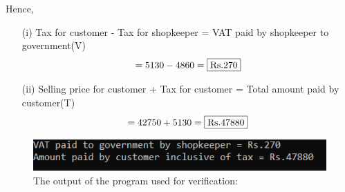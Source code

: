 \documentclass[journal,12pt,two column]{IEEEtran}
\begin{document}
Hence,
\begin{enumerate}
\item[(i)]Tax for customer - Tax for shopkeeper = 
    VAT paid by shopkeeper to government(V)  
     \begin{equation*}
        = 5130 - 4860 = \fbox{Rs.270}
     \end{equation*}
\item[(ii)]Selling price for customer + Tax for customer = Total amount paid by customer(T) 
    \begin{equation*}
       = 42750 + 5130 = \fbox{Rs.47880}
   \end{equation*} 
\end{enumerate}

\begin{figure}[ht!]
     \centering
     \includegraphics[scale = 1]{codeoutput2.png}
     \caption{The output of the program used for verification:}
     \label{fig:Figure 1}
\end{figure}
\end{document}
